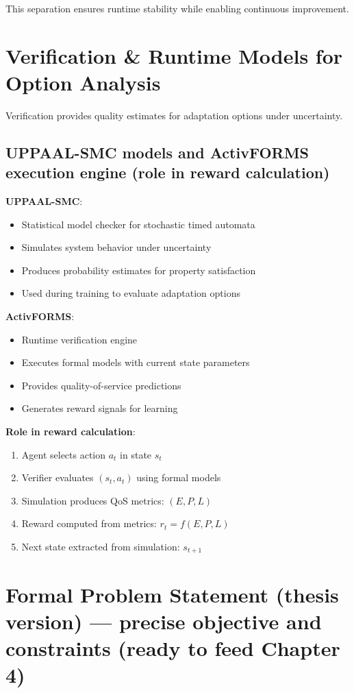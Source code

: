 \documentclass[11pt,a4paper]{article}
\begin{document}
This separation ensures runtime stability while enabling continuous improvement.

\section{Verification \& Runtime Models for Option Analysis}

Verification provides quality estimates for adaptation options under uncertainty.

\subsection{UPPAAL-SMC models and ActivFORMS execution engine (role in reward calculation)}

\textbf{UPPAAL-SMC}:
\begin{itemize}
    \item Statistical model checker for stochastic timed automata
    \item Simulates system behavior under uncertainty
    \item Produces probability estimates for property satisfaction
    \item Used during training to evaluate adaptation options
\end{itemize}

\textbf{ActivFORMS}:
\begin{itemize}
    \item Runtime verification engine
    \item Executes formal models with current state parameters
    \item Provides quality-of-service predictions
    \item Generates reward signals for learning
\end{itemize}

\textbf{Role in reward calculation}:
\begin{enumerate}
    \item Agent selects action $a_t$ in state $s_t$
    \item Verifier evaluates $(s_t, a_t)$ using formal models
    \item Simulation produces QoS metrics: $(E, P, L)$
    \item Reward computed from metrics: $r_t = f(E, P, L)$
    \item Next state extracted from simulation: $s_{t+1}$
\end{enumerate}

\section{Formal Problem Statement (thesis version) --- precise objective and constraints (ready to feed Chapter 4)}
\end{document}

